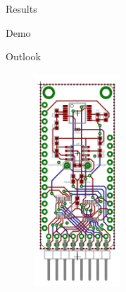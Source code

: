 \documentclass[24pt,ignorenonframetext,]{beamer}
\begin{document}
\begin{frame}{Results}

\end{frame}

\begin{frame}

\begin{block}{Demo}

\end{block}

\end{frame}

\begin{frame}{Outlook}

\begin{figure}
    \begin{center}
        \includegraphics[height=225pt]{images/wing.pdf}
    \end{center}
\end{figure}

\end{frame}
\end{document}
